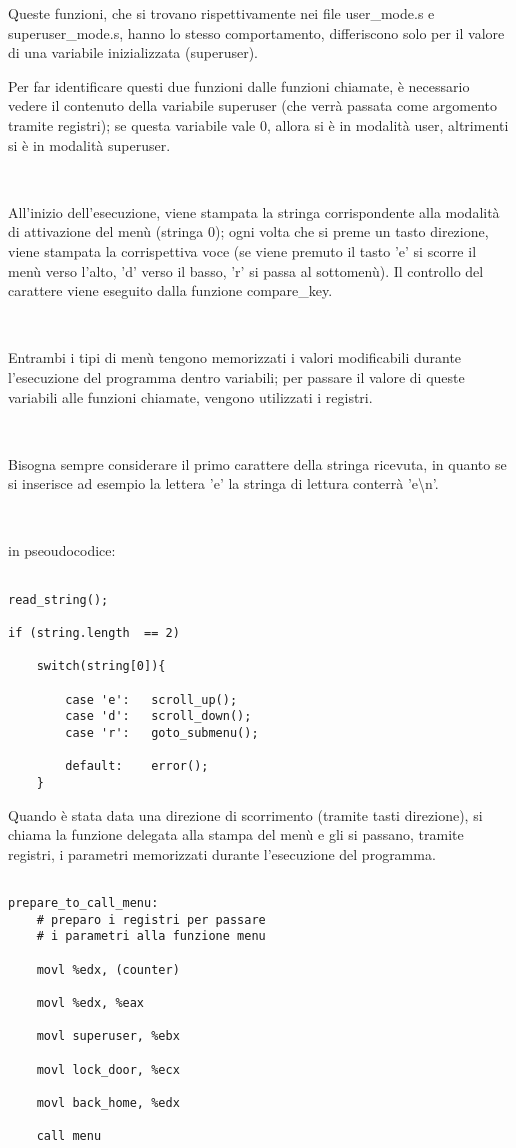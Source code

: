 \documentclass[a4paper,titlepage]{book}
\begin{document}
Queste funzioni, che si trovano rispettivamente nei file user\_mode.s e superuser\_mode.s, hanno lo stesso comportamento, differiscono solo per il valore di una variabile inizializzata (superuser).

Per far identificare questi due funzioni dalle funzioni chiamate, è necessario vedere il contenuto della variabile superuser (che verrà passata come argomento tramite registri); se questa variabile vale 0, allora si è in modalità user, altrimenti si è in modalità superuser. 

~

All'inizio dell'esecuzione, viene stampata la stringa corrispondente alla modalità di attivazione del menù (stringa 0); ogni volta che si preme un tasto direzione, viene stampata la corrispettiva voce (se viene premuto il tasto 'e' si scorre il menù verso l'alto, 'd' verso il basso, 'r' si passa al sottomenù). Il controllo del carattere viene eseguito dalla funzione compare\_key.

~

Entrambi i tipi di menù tengono memorizzati i valori modificabili durante l'esecuzione del programma dentro variabili; per passare il valore di queste variabili alle funzioni chiamate, vengono utilizzati i registri.


~

Bisogna sempre considerare il primo carattere della stringa ricevuta, in quanto se si inserisce ad esempio la lettera 'e' la stringa di lettura conterrà 'e\textbackslash n'.

~

in pseoudocodice:

\begin{lstlisting}

read_string();

if (string.length  == 2)

	switch(string[0]){

		case 'e':	scroll_up();
		case 'd':	scroll_down();
		case 'r':	goto_submenu();

		default:	error();
	}		

\end{lstlisting}

\newpage
Quando è stata data una direzione di scorrimento (tramite tasti direzione), si chiama la funzione delegata alla stampa del menù e gli si passano, tramite registri, i parametri memorizzati durante l'esecuzione del programma.


\begin{lstlisting}

prepare_to_call_menu:
	# preparo i registri per passare
	# i parametri alla funzione menu

	movl %edx, (counter)

	movl %edx, %eax

	movl superuser, %ebx

	movl lock_door, %ecx

	movl back_home, %edx

	call menu

\end{lstlisting}
\end{document}
